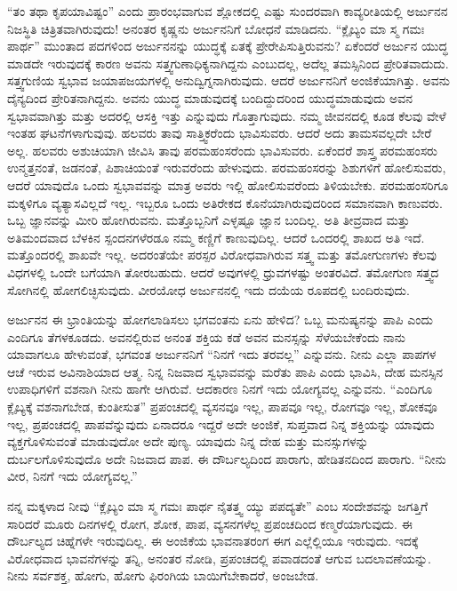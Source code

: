 “ತಂ ತಥಾ ಕೃಪಯಾವಿಷ್ಟಂ” ಎಂದು ಪ್ರಾರಂಭವಾಗುವ ಶ್ಲೋಕದಲ್ಲಿ ಎಷ್ಟು ಸುಂದರವಾಗಿ ಕಾವ್ಯರೀತಿಯಲ್ಲಿ ಅರ್ಜುನನ ನಿಜಸ್ಥಿತಿ ಚಿತ್ರಿತವಾಗಿರುವುದು! ಅನಂತರ ಕೃಷ್ಣನು ಅರ್ಜುನನಿಗೆ ಬೋಧನೆ ಮಾಡಿದನು. “ಕ್ಲೈಬ್ಯಂ ಮಾ ಸ್ಮ ಗಮಃ ಪಾರ್ಥ” ಮುಂತಾದ ಪದಗಳಿಂದ ಅರ್ಜುನನನ್ನು ಯುದ್ಧಕ್ಕೆ ಏತಕ್ಕೆ ಪ್ರೇರೇಪಿಸುತ್ತಿರುವನು? ಏಕೆಂದರೆ ಅರ್ಜುನ ಯುದ್ಧ ಮಾಡದೇ ಇರುವುದಕ್ಕೆ ಕಾರಣ ಅವನು ಸತ್ತ್ವಗುಣಾಧಿಕ್ಯನಾಗಿದ್ದನು ಎಂಬುದಲ್ಲ, ಅದೆಲ್ಲ ತಮಸ್ಸಿನಿಂದ ಪ್ರೇರಿತವಾದುದು. ಸತ್ತ್ವಗುಣಿಯ ಸ್ವಭಾವ ಜಯಾಪಜಯಗಳಲ್ಲಿ ಅನುದ್ವಿಗ್ನನಾಗಿರುವುದು. ಆದರೆ ಅರ್ಜುನನಿಗೆ ಅಂಜಿಕೆಯಾಗಿತ್ತು. ಅವನು ದೈನ್ಯದಿಂದ ಪ್ರೇರಿತನಾಗಿದ್ದನು. ಅವನು ಯುದ್ಧ ಮಾಡುವುದಕ್ಕೆ ಬಂದಿದ್ದುದರಿಂದ ಯುದ್ಧಮಾಡುವುದು ಅವನ ಸ್ವಭಾವವಾಗಿತ್ತು ಮತ್ತು ಅದರಲ್ಲಿ ಆಸಕ್ತಿ ಇತ್ತು ಎನ್ನುವುದು ಗೊತ್ತಾಗುವುದು. ನಮ್ಮ ಜೀವನದಲ್ಲಿ ಕೂಡ ಕೆಲವು ವೇಳೆ ಇಂತಹ ಘಟನೆಗಳಾಗುವುವು. ಹಲವರು ತಾವು ಸಾತ್ತ್ವಿಕರೆಂದು ಭಾವಿಸುವರು. ಆದರೆ ಅದು ತಾಮಸವಲ್ಲದೇ ಬೇರೆ ಅಲ್ಲ. ಹಲವರು ಅಶುಚಿಯಾಗಿ ಜೀವಿಸಿ ತಾವು ಪರಮಹಂಸರೆಂದು ಭಾವಿಸುವರು. ಏಕೆಂದರೆ ಶಾಸ್ತ್ರ ಪರಮಹಂಸರು ಉನ್ಮತ್ತನಂತೆ, ಜಡನಂತೆ, ಪಿಶಾಚಿಯಂತೆ ಇರುವರೆಂದು ಹೇಳುವುದು. ಪರಮಹಂಸರನ್ನು ಶಿಶುಗಳಿಗೆ ಹೋಲಿಸುವರು, ಆದರೆ ಯಾವುದೊ ಒಂದು ಸ್ವಭಾವವನ್ನು ಮಾತ್ರ ಅವರು ಇಲ್ಲಿ ಹೋಲಿಸುವರೆಂದು ತಿಳಿಯಬೇಕು. ಪರಮಹಂಸರಿಗೂ ಮಕ್ಕಳಿಗೂ ವ್ಯತ್ಯಾಸವಿಲ್ಲದೆ ಇಲ್ಲ. ಇಬ್ಬರೂ ಒಂದು ಅತಿರೇಕದ ಕೊನೆಯಾಗಿರುವುದರಿಂದ ಸಮಾನವಾಗಿ ಕಾಣುವರು. ಒಬ್ಬ ಜ್ಞಾನವನ್ನು ಮೀರಿ ಹೋಗಿರುವನು. ಮತ್ತೊಬ್ಬನಿಗೆ ಎಳ್ಳಷ್ಟೂ ಜ್ಞಾನ ಬಂದಿಲ್ಲ. ಅತಿ ತೀವ್ರವಾದ ಮತ್ತು ಅತಿಮಂದವಾದ ಬೆಳಕಿನ ಸ್ಪಂದನಗಳೆರಡೂ ನಮ್ಮ ಕಣ್ಣಿಗೆ ಕಾಣುವುದಿಲ್ಲ. ಆದರೆ ಒಂದರಲ್ಲಿ ಶಾಖದ ಅತಿ ಇದೆ. ಮತ್ತೊಂದರಲ್ಲಿ ಶಾಖವೇ ಇಲ್ಲ. ಅದರಂತೆಯೇ ಪರಸ್ಪರ ವಿರೋಧವಾಗಿರುವ ಸತ್ತ್ವ ಮತ್ತು ತಮೋಗುಣಗಳು ಕೆಲವು ವಿಧಗಳಲ್ಲಿ ಒಂದೇ ಬಗೆಯಾಗಿ ತೋರಬಹುದು. ಆದರೆ ಅವುಗಳಲ್ಲಿ ಧ್ರುವಗಳಷ್ಟು ಅಂತರವಿದೆ. ತಮೋಗುಣ ಸತ್ತ್ವದ ಸೋಗಿನಲ್ಲಿ ಹೋಗಲಿಚ್ಛಿಸುವುದು. ವೀರಯೋಧ ಅರ್ಜುನನಲ್ಲಿ ಇದು ದಯೆಯ ರೂಪದಲ್ಲಿ ಬಂದಿರುವುದು.

ಅರ್ಜುನನ ಈ ಭ್ರಾಂತಿಯನ್ನು ಹೋಗಲಾಡಿಸಲು ಭಗವಂತನು ಏನು ಹೇಳಿದ? ಒಬ್ಬ ಮನುಷ್ಯನನ್ನು ಪಾಪಿ ಎಂದು ಎಂದಿಗೂ ತೆಗಳಕೂಡದು. ಅವನಲ್ಲಿರುವ ಅನಂತ ಶಕ್ತಿಯ ಕಡೆ ಅವನ ಮನಸ್ಸನ್ನು ಸೆಳೆಯಬೇಕೆಂದು ನಾನು ಯಾವಾಗಲೂ ಹೇಳುವಂತೆ, ಭಗವಂತ ಅರ್ಜುನನಿಗೆ “ನಿನಗೆ ಇದು ತರವಲ್ಲ” ಎನ್ನುವನು. ನೀನು ಎಲ್ಲಾ ಪಾಪಗಳ ಆಚೆ ಇರುವ ಅವಿನಾಶಿಯಾದ ಆತ್ಮ. ನಿನ್ನ ನಿಜವಾದ ಸ್ವಭಾವವನ್ನು ಮರೆತು ಪಾಪಿ ಎಂದು ಭಾವಿಸಿ, ದೇಹ ಮನಸ್ಸಿನ ಉಪಾಧಿಗಳಿಗೆ ವಶನಾಗಿ ನೀನು ಹಾಗೇ ಆಗಿರುವೆ. ಆದಕಾರಣ ನಿನಗೆ ಇದು ಯೋಗ್ಯವಲ್ಲ ಎನ್ನುವನು. “ಎಂದಿಗೂ ಕ್ಲೈಬ್ಯಕ್ಕೆ ವಶನಾಗಬೇಡ, ಕುಂತೀಸುತ” ಪ್ರಪಂಚದಲ್ಲಿ ವ್ಯಸನವೂ ಇಲ್ಲ, ಪಾಪವೂ ಇಲ್ಲ, ರೋಗವೂ ಇಲ್ಲ, ಶೋಕವೂ ಇಲ್ಲ, ಪ್ರಪಂಚದಲ್ಲಿ ಪಾಪವೆನ್ನುವುದು ಏನಾದರೂ ಇದ್ದರೆ ಅದೇ ಅಂಜಿಕೆ, ಸುಪ್ತವಾದ ನಿನ್ನ ಶಕ್ತಿಯನ್ನು ಯಾವುದು ವ್ಯಕ್ತಗೊಳಿಸುವಂತೆ ಮಾಡುವುದೋ ಅದೇ ಪುಣ್ಯ. ಯಾವುದು ನಿನ್ನ ದೇಹ ಮತ್ತು ಮನಸ್ಸುಗಳನ್ನು ದುರ್ಬಲಗೊಳಿಸುವುದೊ ಅದೇ ನಿಜವಾದ ಪಾಪ. ಈ ದೌರ್ಬಲ್ಯದಿಂದ ಪಾರಾಗು, ಹೇಡಿತನದಿಂದ ಪಾರಾಗು. “ನೀನು ವೀರ, ನಿನಗೆ ಇದು ಯೋಗ್ಯವಲ್ಲ.”

ನನ್ನ ಮಕ್ಕಳಾದ ನೀವು “ಕ್ಲೈಬ್ಯಂ ಮಾ ಸ್ಮ ಗಮಃ ಪಾರ್ಥ ನೈತತ್ತ್ವ ಯ್ಯು ಪಪದ್ಯತೇ” ಎಂಬ ಸಂದೇಶವನ್ನು ಜಗತ್ತಿಗೆ ಸಾರಿದರೆ ಮೂರು ದಿನಗಳಲ್ಲಿ ರೋಗ, ಶೋಕ, ಪಾಪ, ವ್ಯಸನಗಳೆಲ್ಲ ಪ್ರಪಂಚದಿಂದ ಕಣ್ಮರೆಯಾಗುವುದು. ಈ ದೌರ್ಬಲ್ಯದ ಚಿಹ್ನೆಗಳೇ ಇರುವು\-ದಿಲ್ಲ. ಈ ಅಂಜಿಕೆಯ ಭಾವನಾತರಂಗ ಈಗ ಎಲ್ಲೆಲ್ಲಿಯೂ ಇರುವುದು. ಇದಕ್ಕೆ ವಿರೋಧ\-ವಾದ ಭಾವನೆಗಳನ್ನು ತನ್ನಿ, ಅನಂತರ ನೋಡಿ, ಪ್ರಪಂಚದಲ್ಲಿ ಪವಾಡದಂತೆ ಆಗುವ ಬದಲಾವಣೆಯನ್ನು. ನೀನು ಸರ್ವಶಕ್ತ, ಹೋಗು, ಹೋಗು ಫಿರಂಗಿಯ ಬಾಯಿಗೆ\break ಬೇಕಾದರೆ, ಅಂಜಬೇಡ.

